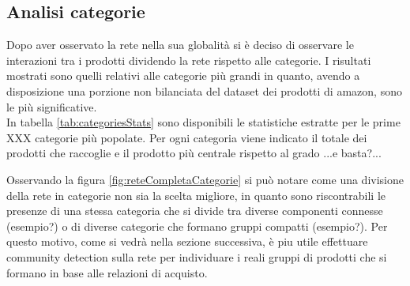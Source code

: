 \subsection{Analisi categorie}
Dopo aver osservato la rete nella sua globalità si è deciso di osservare le interazioni tra i prodotti dividendo la rete rispetto alle categorie. I risultati mostrati sono quelli relativi alle categorie più grandi in quanto, avendo a disposizione una porzione non bilanciata del dataset dei prodotti di amazon, sono le più significative. \\
In tabella \ref{tab:categoriesStats} sono disponibili le statistiche estratte per le prime XXX categorie più popolate. Per ogni categoria viene indicato il totale dei prodotti che raccoglie e il prodotto più centrale rispetto al grado ...e basta?...



Osservando la figura \ref{fig:reteCompletaCategorie} si può notare come una divisione della rete in categorie non sia la scelta migliore, in quanto sono riscontrabili le presenze di una stessa categoria che si divide tra diverse componenti connesse (esempio?) o di diverse categorie che formano gruppi compatti (esempio?). %
Per questo motivo, come si vedrà nella sezione successiva, è piu utile effettuare community detection sulla rete per individuare i reali gruppi di prodotti che si formano in base alle relazioni di acquisto.

